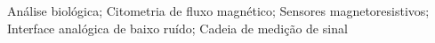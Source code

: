
\noindent

Análise biológica; Citometria de fluxo magnético; Sensores magnetoresistivos; Interface analógica de baixo ruído; Cadeia de medição de sinal
